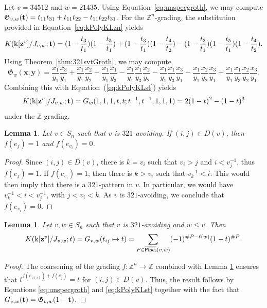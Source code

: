 \documentclass[12pt]{amsart}
\newtheorem{lemma}[theorem]{Lemma}
\theoremstyle{definition}
\newenvironment{example}
  {\pushQED{\qed}\renewcommand{\qedsymbol}{$\diamondsuit$}\examplex}
  {\popQED\endexamplex}
\theoremstyle{remark}
\numberwithin{equation}{section}
\newcommand{\KPipes}{\overline{\sf Pipes}}
\begin{document}
\begin{example}
Let $v=34512$ and $w=21435$. Using Equation~\eqref{eq:unspecgroth}, we may compute $\mathfrak{G}_{v,w}({\bf t})=t_{11}t_{31}+t_{11}t_{22}-t_{11}t_{22}t_{31}$. For the $\mathbb{Z}^n$-grading, the substitution provided in Equation~\eqref{eq:kPolyKLzn} yields 
\[K(\Bbbk[{\bf z}^v]/J_{v,w};{\bf t}) =(1-\frac{t_{3}}{t_{1}})(1-\frac{t_{5}}{t_{1}})+(1-\frac{t_{3}}{t_{1}})(1-\frac{t_{4}}{t_{2}})-(1-\frac{t_{3}}{t_{1}})(1-\frac{t_{5}}{t_{1}})(1-\frac{t_{4}}{t_{2}}).\]
Using Theorem~\ref{thm:321svtGroth}, we may compute 
\[\mathfrak G_w({\mathbf x};{{\mathbf y}})=\frac{x_{1}}{y_{1}}\frac{x_{3}}{y_{1}}
+\frac{x_{1}}{y_{1}}\frac{x_{2}}{y_{2}}
+\frac{x_{1}}{y_{1}}\frac{x_{1}}{y_{3}}
-\frac{x_{1}}{y_{1}}\frac{x_{1}}{y_{3}}\frac{x_{2}}{y_{2}}
-\frac{x_{1}}{y_{1}}\frac{x_{1}}{y_{3}}\frac{x_{3}}{y_{1}}
-\frac{x_{1}}{y_{1}}\frac{x_{2}}{y_{2}}\frac{x_{3}}{y_{1}}
+\frac{x_{1}}{y_{1}}\frac{x_{1}}{y_{3}}\frac{x_{2}}{y_{2}}\frac{x_{3}}{y_{1}}.\]
Combining this with Equation~(\ref{eq:kPolyKLst}) yields
\[K(\Bbbk[{\bf z}^v]/J_{v,w};{\bf t}) =G_w(1,1,1,t,t;t^{-1},t^{-1},1,1,1)=2(1-t)^2-(1-t)^3\]
under the $\mathbb{Z}$-grading.
\end{example}

\begin{lemma}\label{lemma:321weight}
Let $v\in S_n$ such that $v$ is $321$-avoiding.  If $(i,j)\in D(v)$, then $f(e_j)=1$ and $f(e_{v_i})=0$.
\end{lemma}
\begin{proof}
Since $(i,j)\in D(v)$, there is $k=v_i$ such that $v_i>j$ and $i<v^{-1}_j$, thus $f(e_j)=1$.
If $f(e_{v_i})=1$, then there is $k>v_i$ such that $v^{-1}_k<i$. This would then imply that there is a $321$-pattern in $v$. In particular, we would have $v^{-1}_k<i<v^{-1}_j$, with $j<v_i<k$. As $v$ is $321$-avoiding, we conclude that $f(e_{v_i}) = 0$. 
\end{proof}






\begin{lemma}\label{lem:321KFormula}
Let $v,w\in S_n$ such that $v$ is $321$-avoiding and $w\leq v$.
Then 
\begin{equation}
   K(\Bbbk[{\bf z}^v]/J_{v,w};t) = G_{v,w}(t_{ij} \mapsto t) = \sum_{P\in \KPipes(v,w)}(-1)^{\#P-\ell(w)}(1-t)^{\#P}.
\end{equation}
\end{lemma}

\begin{proof}
 The coarsening of the grading $f:\mathbb{Z}^n\rightarrow \mathbb{Z}$ combined with
Lemma \ref{lemma:321weight} ensures that $t^{f(e_{v(i)})+f(e_j)} = t$ for $(i,j)\in D(v)$.  
Thus, the result follows by Equations \eqref{eq:unspecgroth} and \eqref{eq:kPolyKLst} together with the fact that $G_{v,w}({\bf t}) = \mathfrak{G}_{v,w}(1-{\bf t})$.
\end{proof}
\end{document}

